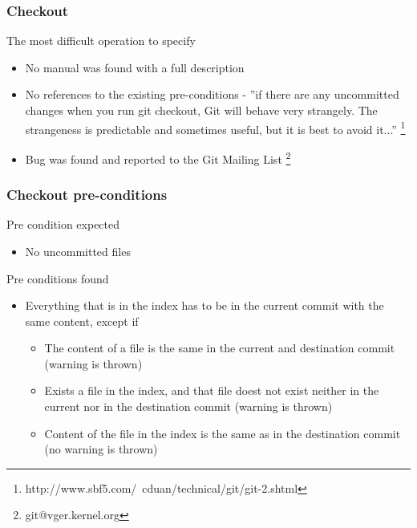 \documentclass{beamer}
\begin{document}
\begin{frame}[fragile]
	\frametitle{Checkout}
	\begin{block}{The most difficult operation to specify}
	\begin{itemize}
		\item No manual was found with a full description
		\item No references to the existing pre-conditions - ''if there
      are any uncommitted changes when you run git checkout, Git will
      behave very strangely. The strangeness is predictable and
      sometimes useful, but it is best to avoid it...''
      \footnote{http://www.sbf5.com/~cduan/technical/git/git-2.shtml}
		\item Bug was found and reported to the Git Mailing List
      \footnote{git@vger.kernel.org}
	\end{itemize}
	\end{block}
\end{frame}

\begin{frame}
	\frametitle{Checkout pre-conditions}
	\begin{block}{Pre condition expected}
	\begin{itemize}
		\item No uncommitted files
	\end{itemize}
	\end{block}
	\begin{block}{Pre conditions found}
	\begin{itemize}
		\item Everything that is in the index has to be
		in the current commit with the same content, except if
		\begin{itemize}
		\item The content of a file is the same in the current
		and destination commit (warning is thrown)
		\item Exists a file in the index, and that file doest not
		exist neither in the current nor in the destination commit
		(warning is thrown)
		\item Content of the file in the index is the same as in the
		destination commit (no warning is thrown)
		\end{itemize}
	\end{itemize}
	\end{block}
\end{frame}
\end{document}

